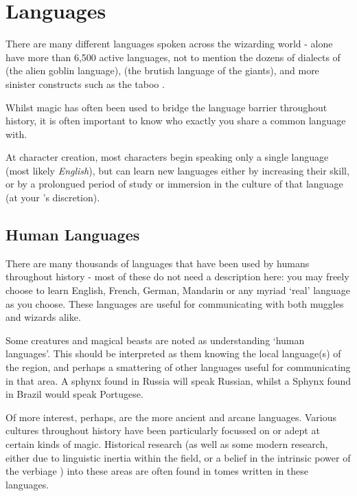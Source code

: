\chapter{Languages} \label{S:Languages}

There are many different languages spoken across the wizarding world -  alone have more than 6,500 active languages, not to mention the dozens of dialects of  (the alien goblin language),  (the brutish language of the giants), and more sinister constructs such as the taboo .

Whilst magic has often been used to bridge the language barrier throughout history, it is often important to know who exactly you share a common language with. 

At character creation, most characters begin speaking only a single language (most likely {\it English}), but can learn new languages either by increasing their  skill, or by a prolongued period of study or immersion in the culture of that language (at your 's discretion).

\section{Human Languages}

There are many thousands of languages that have been used by humans throughout history - most of these do not need a description here: you may freely choose to learn English, French, German, Mandarin or any myriad `real' language as you choose. These languages are useful for communicating with both muggles and wizards alike. 

Some creatures and magical beasts are noted as understanding `human languages'. This should be interpreted as them knowing the local language(s) of the region, and perhaps a smattering of other languages useful for communicating in that area. A sphynx found in Russia will speak Russian, whilst a Sphynx found in Brazil would speak Portugese.

Of more interest, perhaps, are the more ancient and arcane languages. Various cultures throughout history have been particularly focussed on or adept at certain kinds of magic. Historical research (as well as some modern research, either due to linguistic inertia within the field, or a belief in the intrinsic power of the verbiage ) into these areas are often found in tomes written in these languages.

\newcommand\languageName[3]
{
	\subsubsection{\key{#1}}
	
	#2
	
	\key{Script:} #3

}

